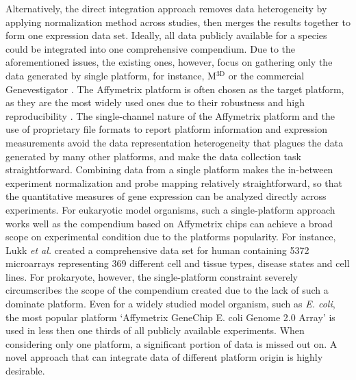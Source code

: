 Alternatively, the direct integration approach removes data heterogeneity by
applying normalization method across studies, then merges the results together
to form one expression data set.
%
Ideally, all data publicly available for a species could be integrated into
one comprehensive compendium.
%
Due to the aforementioned issues, the existing ones, however, focus on gathering
only the data generated by single platform, for instance, M$^{\textrm{3D}}$
\cite{Faith2008} or the commercial Genevestigator \cite{Hruz2008}.
%
The Affymetrix platform is often chosen as the target platform, as they are the
most widely used ones due to their robustness and high reproducibility
\cite{Bammler2005, Irizarry2005}.
%
The single-channel nature of the Affymetrix platform and the use of proprietary
file formats to report platform information and expression measurements avoid
the data representation heterogeneity that plagues the data generated by many
other platforms, and make the data collection task straightforward.
%
Combining data from a single platform makes the in-between experiment
normalization and probe mapping relatively straightforward, so that the
quantitative measures of gene expression can be analyzed directly across
experiments.
%
%
For eukaryotic model organisms, such a single-platform approach works well as
the compendium based on Affymetrix chips can achieve a broad scope on
experimental condition due to the platforms popularity.
%
For instance, Lukk \textit{et al.} \cite{Lukk2010} created a comprehensive data
set for human containing 5372 microarrays representing 369 different cell and
tissue types, disease states and cell lines.
%
For prokaryote, however, the single-platform constraint severely circumscribes
the scope of the compendium created due to the lack of such a dominate platform.
%
Even for a widely studied model organism, such as {\it E. coli}, the most 
popular platform `Affymetrix GeneChip E. coli Genome 2.0 Array' is used in less 
then one thirds of all publicly available experiments.
%
When considering only one platform, a significant portion of data is missed out 
on.  A novel approach that can integrate data of different platform origin is 
highly desirable.



